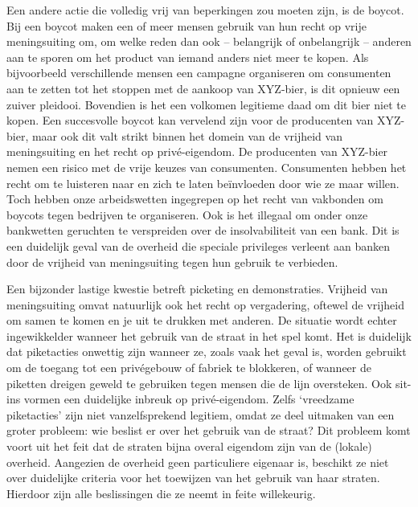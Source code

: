 \documentclass[
  a5paper,
  smalldemyvopaper,10pt,twoside,onecolumn,openright,extrafontsizes,hidelinks]{memoir}
\begin{document}
Een andere actie die volledig vrij van beperkingen zou moeten zijn, is
de boycot. Bij een boycot maken een of meer mensen gebruik van hun recht
op vrije meningsuiting om, om welke reden dan ook -- belangrijk of
onbelangrijk -- anderen aan te sporen om het product van iemand anders
niet meer te kopen. Als bijvoorbeeld verschillende mensen een campagne
organiseren om consumenten aan te zetten tot het stoppen met de aankoop
van XYZ-bier, is dit opnieuw een zuiver pleidooi. Bovendien is het een
volkomen legitieme daad om dit bier niet te kopen. Een succesvolle
boycot kan vervelend zijn voor de producenten van XYZ-bier, maar ook dit
valt strikt binnen het domein van de vrijheid van meningsuiting en het
recht op privé-eigendom. De producenten van XYZ-bier nemen een risico
met de vrije keuzes van consumenten. Consumenten hebben het recht om te
luisteren naar en zich te laten beïnvloeden door wie ze maar willen.
Toch hebben onze arbeidswetten ingegrepen op het recht van vakbonden om
boycots tegen bedrijven te organiseren. Ook is het illegaal om onder
onze bankwetten geruchten te verspreiden over de insolvabiliteit van een
bank. Dit is een duidelijk geval van de overheid die speciale privileges
verleent aan banken door de vrijheid van meningsuiting tegen hun gebruik
te verbieden.

Een bijzonder lastige kwestie betreft picketing en demonstraties.
Vrijheid van meningsuiting omvat natuurlijk ook het recht op
vergadering, oftewel de vrijheid om samen te komen en je uit te drukken
met anderen. De situatie wordt echter ingewikkelder wanneer het gebruik
van de straat in het spel komt. Het is duidelijk dat piketacties
onwettig zijn wanneer ze, zoals vaak het geval is, worden gebruikt om de
toegang tot een privégebouw of fabriek te blokkeren, of wanneer de
piketten dreigen geweld te gebruiken tegen mensen die de lijn
oversteken. Ook sit-ins vormen een duidelijke inbreuk op privé-eigendom.
Zelfs `vreedzame piketacties' zijn niet vanzelfsprekend legitiem, omdat
ze deel uitmaken van een groter probleem: wie beslist er over het
gebruik van de straat? Dit probleem komt voort uit het feit dat de
straten bijna overal eigendom zijn van de (lokale) overheid. Aangezien
de overheid geen particuliere eigenaar is, beschikt ze niet over
duidelijke criteria voor het toewijzen van het gebruik van haar straten.
Hierdoor zijn alle beslissingen die ze neemt in feite willekeurig.
\end{document}
